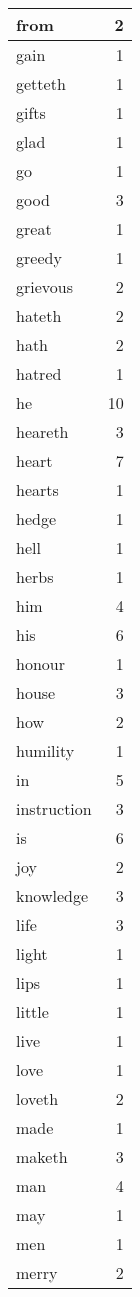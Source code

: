 \begin{center}
\begin{longtable}{l|r}
from & 2\\ \hline 
gain & 1\\ \hline 
getteth & 1\\ \hline 
gifts & 1\\ \hline 
glad & 1\\ \hline 
go & 1\\ \hline 
good & 3\\ \hline 
great & 1\\ \hline 
greedy & 1\\ \hline 
grievous & 2\\ \hline 
hateth & 2\\ \hline 
hath & 2\\ \hline 
hatred & 1\\ \hline 
he & 10\\ \hline 
heareth & 3\\ \hline 
heart & 7\\ \hline 
hearts & 1\\ \hline 
hedge & 1\\ \hline 
hell & 1\\ \hline 
herbs & 1\\ \hline 
him & 4\\ \hline 
his & 6\\ \hline 
honour & 1\\ \hline 
house & 3\\ \hline 
how & 2\\ \hline 
humility & 1\\ \hline 
in & 5\\ \hline 
instruction & 3\\ \hline 
is & 6\\ \hline 
joy & 2\\ \hline 
knowledge & 3\\ \hline 
life & 3\\ \hline 
light & 1\\ \hline 
lips & 1\\ \hline 
little & 1\\ \hline 
live & 1\\ \hline 
love & 1\\ \hline 
loveth & 2\\ \hline 
made & 1\\ \hline 
maketh & 3\\ \hline 
man & 4\\ \hline 
may & 1\\ \hline 
men & 1\\ \hline 
merry & 2\\ \hline 

\end{longtable}
\end{center}
